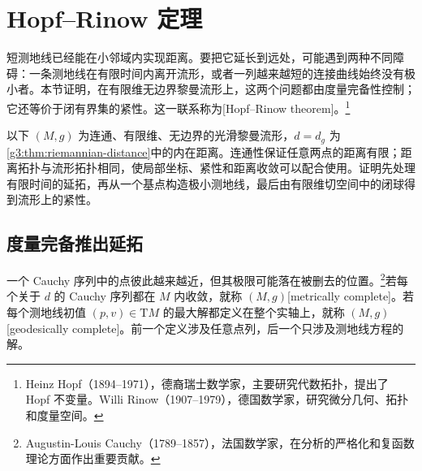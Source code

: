 
% 
% 

\section{Hopf–Rinow 定理}
\label{g3:sec:0203}

短测地线已经能在小邻域内实现距离。要把它延长到远处，可能遇到两种不同障碍：一条测地线在有限时间内离开流形，或者一列越来越短的连接曲线始终没有极小者。本节证明，在有限维无边界黎曼流形上，这两个问题都由度量完备性控制；它还等价于闭有界集的紧性。这一联系称为[Hopf--Rinow theorem]。\footnote{Heinz Hopf（1894--1971），德裔瑞士数学家，主要研究代数拓扑，提出了 Hopf 不变量。Willi Rinow（1907--1979），德国数学家，研究微分几何、拓扑和度量空间。}

\ProseParagraphBreak

以下 \((M,g)\) 为连通、有限维、无边界的光滑黎曼流形，\(d=d_g\) 为\cref{g3:thm:riemannian-distance}中的内在距离。连通性保证任意两点的距离有限；距离拓扑与流形拓扑相同，使局部坐标、紧性和距离收敛可以配合使用。证明先处理有限时间的延拓，再从一个基点构造极小测地线，最后由有限维切空间中的闭球得到流形上的紧性。

\subsection{度量完备推出延拓}
\label{g3:subsec:0203:01}
一个 Cauchy 序列中的点彼此越来越近，但其极限可能落在被删去的位置。\footnote{Augustin-Louis Cauchy（1789--1857），法国数学家，在分析的严格化和复函数理论方面作出重要贡献。}若每个关于 \(d\) 的 Cauchy 序列都在 \(M\) 内收敛，就称 \((M,g)\)[metrically complete]。若每个测地线初值 \((p,v)\in\mathrm TM\) 的最大解都定义在整个实轴上，就称 \((M,g)\)[geodesically complete]。前一个定义涉及任意点列，后一个只涉及测地线方程的解。

